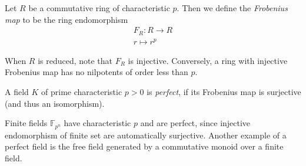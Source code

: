 \begin{definition}
    Let $R$ be a commutative ring of characteristic $p$. Then we define the \emph{Frobenius map} to be the ring endomorphism
    \begin{gather*}
        F_R : R \rightarrow R\\
        r \mapsto r^p        
    \end{gather*}
\end{definition}
\begin{remark}
    When $R$ is reduced, note that $F_R$ is injective. Conversely, a ring with injective Frobenius map has no nilpotents of order less than $p$.  
\end{remark}
\begin{definition}
    A field $K$ of prime characteristic $p>0$ is \emph{perfect}, if its Frobenius map is surjective (and thus an isomorphism).  
\end{definition}
\begin{example}
    Finite fields $\mathbb{F}_{p^n}$ have characteristic $p$ and are perfect, since injective endomorphism of finite set are automatically surjective. Another example of a perfect field is the free field generated by a commutative monoid over a finite field.  
\end{example}

